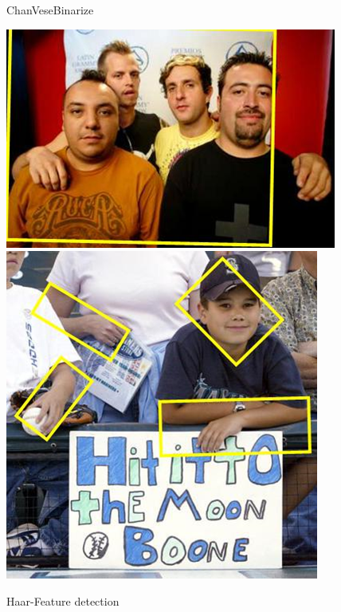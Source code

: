 \begin{figure}[h]
	\begin{minipage}{.33\textwidth}
		\caption{ChanVeseBinarize}
		\centering \includegraphics[width=0.95\linewidth]{illustrations/faces/1/ChanVese}
		\centering \includegraphics[width=0.95\linewidth]{illustrations/faces/2/ChanVese}
	\end{minipage}
	\begin{minipage}{.33\textwidth}
		\caption{Haar-Feature detection}

\end{minipage}
\end{figure}
